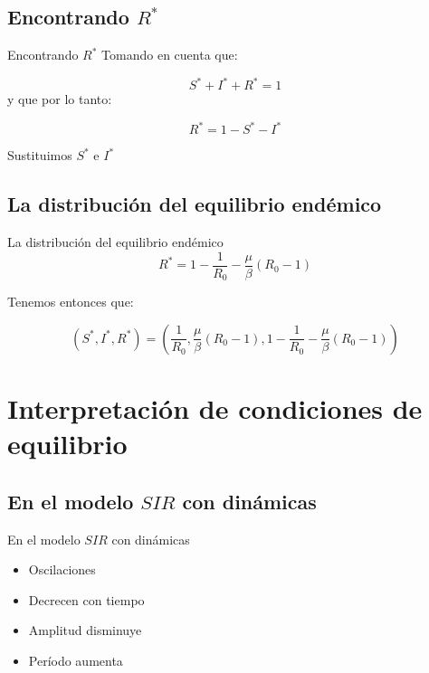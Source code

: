 \documentclass[
  11pt,
  ignorenonframetext,
]{beamer}
\begin{document}
\hypertarget{encontrando-r}{%
\subsection{\texorpdfstring{Encontrando
\(R^*\)}{Encontrando R\^{}*}}\label{encontrando-r}}

\begin{frame}{Encontrando \(R^*\)}
Tomando en cuenta que:

\[S^* + I^* + R^* = 1\] y que por lo tanto:

\[R^* = 1 - S^* - I^*\]

Sustituimos \(S^*\) e \(I^*\)
\end{frame}

\hypertarget{la-distribuciuxf3n-del-equilibrio-enduxe9mico}{%
\subsection{La distribución del equilibrio
endémico}\label{la-distribuciuxf3n-del-equilibrio-enduxe9mico}}

\begin{frame}{La distribución del equilibrio endémico}
\[R^* = 1 - \frac{1}{R_0} - \frac{\mu}{\beta}(R_0-1)\]

Tenemos entonces que:

\[(S^*, I^*, R^*) = \left( \frac{1}{R_0}, \frac{\mu}{\beta}(R_0 - 1), 1 - \frac{1}{R_0} - \frac{\mu}{\beta}(R_0-1)\right)\]
\end{frame}

\hypertarget{interpretaciuxf3n-de-condiciones-de-equilibrio}{%
\section{Interpretación de condiciones de
equilibrio}\label{interpretaciuxf3n-de-condiciones-de-equilibrio}}

\hypertarget{en-el-modelo-sir-con-dinuxe1micas}{%
\subsection{\texorpdfstring{En el modelo \(SIR\) con
dinámicas}{En el modelo SIR con dinámicas}}\label{en-el-modelo-sir-con-dinuxe1micas}}

\begin{frame}{En el modelo \(SIR\) con dinámicas}
\begin{itemize}
\item
  Oscilaciones
\item
  Decrecen con tiempo
\item
  Amplitud disminuye
\item
  Período aumenta
\end{itemize}
\end{frame}
\end{document}
